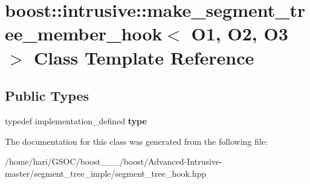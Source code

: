 \hypertarget{classboost_1_1intrusive_1_1make__segment__tree__member__hook}{}\section{boost\+:\+:intrusive\+:\+:make\+\_\+segment\+\_\+tree\+\_\+member\+\_\+hook$<$ O1, O2, O3 $>$ Class Template Reference}
\label{classboost_1_1intrusive_1_1make__segment__tree__member__hook}
\subsection*{Public Types}
\begin{DoxyCompactItemize}
\item 
\mbox{\label{classboost_1_1intrusive_1_1make__segment__tree__member__hook_a065e56f8c3705474d1e68630bed1c475}} 
typedef implementation\+\_\+defined {\bfseries type}
\end{DoxyCompactItemize}


The documentation for this class was generated from the following file\+:\begin{DoxyCompactItemize}
\item 
/home/hari/\+G\+S\+O\+C/boost\+\_\+\_\+\_/boost/\+Advanced-\/\+Intrusive-\/master/segment\+\_\+tree\+\_\+imple/segment\+\_\+tree\+\_\+hook.\+hpp\end{DoxyCompactItemize}
